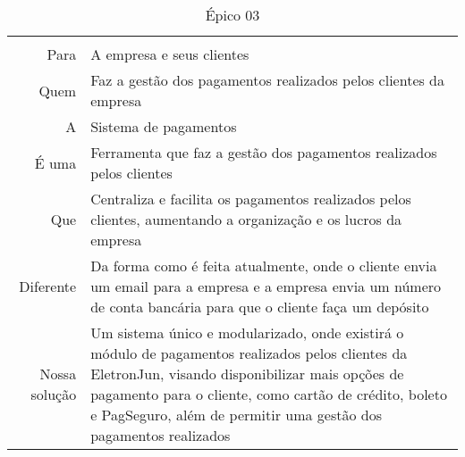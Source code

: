 \begin{table}[]
\centering
\caption{Épico 03}
\label{label-epico03}
\begin{tabular}{
>{\columncolor[HTML]{96FFFB}}r l}
\multicolumn{2}{c}{\cellcolor[HTML]{34CDF9}Gerenciamento de pagamentos}                                                                                                                                                                                                                                             \\
Para                 & A empresa e seus clientes                                                                                                                                                                                                                                                        \\
Quem                 & Faz a gestão dos pagamentos realizados pelos clientes da empresa                                                                                                                                                                                                                 \\
A                    & Sistema de pagamentos                                                                                                                                                                                                                                                            \\
É uma                & Ferramenta que faz a gestão dos pagamentos realizados pelos clientes                                                                                                                                                                                                             \\
Que                  & Centraliza e facilita os pagamentos realizados pelos clientes, aumentando a organização e os lucros da empresa                                                                                                                                                                   \\
Diferente            & Da forma como é feita atualmente, onde o cliente envia um email para a empresa e a empresa envia um número de conta bancária para que o cliente faça um depósito                                                                                                                 \\
Nossa solução        & Um sistema único e modularizado, onde existirá o módulo de pagamentos realizados pelos clientes da EletronJun, visando disponibilizar mais opções de pagamento para o cliente, como cartão de crédito, boleto e PagSeguro, além de permitir uma gestão dos pagamentos realizados \\

\end{tabular}
\end{table}
